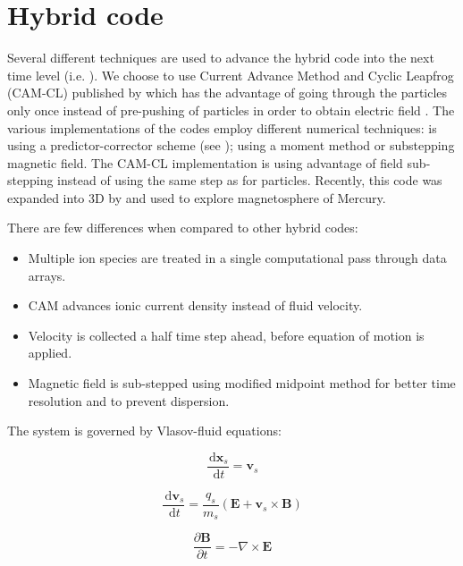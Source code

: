 \documentclass[oneside,branding,toc,article]{satdoc}
\begin{document}
\section{Hybrid code}

Several different techniques are used to advance the hybrid code into the next
time level (i.e. \cite{winske85, wiom93, wiom96}).  We choose to use Current
Advance Method and Cyclic Leapfrog (CAM-CL) published by \cite{matthews94}
which has the advantage of going through the particles only once instead of
pre-pushing of particles in order to obtain electric field \citep{harned82}.
The various implementations of the codes employ different numerical techniques:
\cite{harned82} is using a predictor-corrector scheme (see \cite{nr92});
\cite{wiqu88} using a moment method or \cite{hoshan89} substepping magnetic
field.  The CAM-CL implementation is using advantage of field sub-stepping
instead of using the same step as for particles.  Recently, this code was
expanded into 3D by \cite{travea07} and used to explore magnetosphere of
Mercury.

There are few differences when compared to other hybrid codes:
\begin{itemize}
\item Multiple ion species are treated in a single computational pass through
  data arrays.
\item CAM advances ionic current density instead of fluid velocity.
\item Velocity is collected a half time step ahead, before equation of motion
  is applied.
\item Magnetic field is sub-stepped using modified midpoint method \citep{nr92}
  for better time resolution and to prevent dispersion.
\end{itemize}

The system is governed by Vlasov-fluid equations:

\begin{equation}
  \frac{\, {\mathrm d}{\mathbf{x}_s}}{\, {\mathrm d}{t}} = \mathbf{v}_s
\end{equation}

\begin{equation}
  \frac{\, {\mathrm d}{\mathbf{v}_s}}{\, {\mathrm d}{t}} =
  \frac{q_s}{m_s} ( \mathbf{E} + \mathbf{v}_s \times \mathbf{B} )
\end{equation}

\begin{equation}
  \frac{\partial \mathbf{B}}{\partial t} = - \nabla \times \mathbf{E}
  \label{eq:faraday}
\end{equation}
\end{document}
